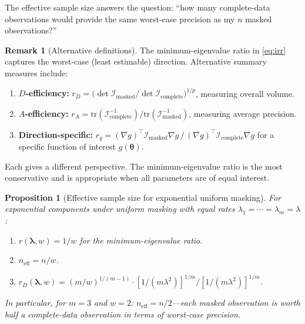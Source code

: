 \documentclass[11pt]{article}
\theoremstyle{definition}
\newtheorem{remark}{Remark}
\theoremstyle{plain}
\newtheorem{proposition}{Proposition}
\renewcommand{\v}[1]{\boldsymbol{#1}}
\newcommand{\btheta}{\v{\theta}}
\newcommand{\tr}{\mathrm{tr}}
\newcommand{\FI}{\mathcal{I}}       %
\begin{document}
The effective sample size answers the question: ``how many
complete-data observations would provide the same worst-case
precision as my $n$ masked observations?''

\begin{remark}[Alternative definitions]
\label{rem:ess-alternatives}
The minimum-eigenvalue ratio in \eqref{eq:irr} captures the worst-case
(least estimable) direction.
Alternative summary measures include:
\begin{enumerate}[nosep]
    \item \textbf{$D$-efficiency:}
    $r_D = \bigl(\det \FI_{\mathrm{masked}} / \det \FI_{\mathrm{complete}}\bigr)^{1/p}$,
    measuring overall volume.
    \item \textbf{$A$-efficiency:}
    $r_A = \tr(\FI_{\mathrm{complete}}^{-1}) / \tr(\FI_{\mathrm{masked}}^{-1})$,
    measuring average precision.
    \item \textbf{Direction-specific:}
    $r_g = (\nabla g)^\top \FI_{\mathrm{masked}} \nabla g \,/\,
    (\nabla g)^\top \FI_{\mathrm{complete}} \nabla g$
    for a specific function of interest $g(\btheta)$.
\end{enumerate}
Each gives a different perspective.
The minimum-eigenvalue ratio is the most conservative and is
appropriate when all parameters are of equal interest.
\end{remark}

\begin{proposition}[Effective sample size for exponential uniform masking]
\label{prop:ess-expo}
For exponential components under uniform masking with equal rates
$\lambda_1 = \cdots = \lambda_m = \lambda$:
\begin{enumerate}[label=(\alph*)]
    \item $r(\v{\lambda}, w) = 1/w$ for the minimum-eigenvalue ratio.
    \item $n_{\mathrm{eff}} = n / w$.
    \item $r_D(\v{\lambda}, w) = (m/w)^{1/(m-1)} \cdot [1/(m\lambda^2)]^{1/m} / [1/(m\lambda^2)]^{1/m}$.
\end{enumerate}
In particular, for $m = 3$ and $w = 2$:
$n_{\mathrm{eff}} = n/2$---each masked observation is worth half a
complete-data observation in terms of worst-case precision.
\end{proposition}
\end{document}
